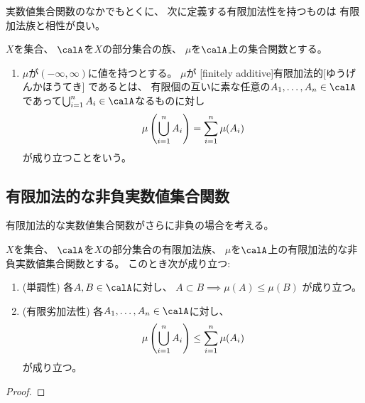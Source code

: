 \documentclass[report]{jlreq}
\begin{document}
実数値集合関数のなかでもとくに、
次に定義する有限加法性を持つものは
有限加法族と相性が良い。

\begin{definition}[有限加法性]
    $X$を集合、
    $\calA$を$X$の部分集合の族、
    $\mu$を$\calA$上の集合関数とする。
    \begin{enumerate}
        \item $\mu$が$(-\infty, \infty)$に値を持つとする。
            $\mu$が
            [finitely additive]{有限加法的}[ゆうげんかほうてき]
            であるとは、
            有限個の互いに素な任意の$A_1, \dots, A_n \in \calA$
            であって$\bigcup_{i = 1}^n A_i \in \calA$なるものに対し
            \begin{equation}
                \mu\left({\bigcup_{i = 1}^n A_i}\right) = \sum_{i = 1}^n \mu(A_i)
            \end{equation}
            が成り立つことをいう。
    \end{enumerate}
\end{definition}

\subsection{有限加法的な非負実数値集合関数}

有限加法的な実数値集合関数がさらに非負の場合を考える。

\begin{proposition}[有限加法的な非負実数値集合関数の基本性質]
    $X$を集合、
    $\calA$を$X$の部分集合の有限加法族、
    $\mu$を$\calA$上の有限加法的な非負実数値集合関数とする。
    このとき次が成り立つ:
    \begin{enumerate}
        \item (単調性) 各$A, B \in \calA$に対し、
            $A \subset B \implies \mu(A) \leq \mu(B)$
            が成り立つ。
        \item (有限劣加法性) 各$A_1, \dots, A_n \in \calA$に対し、
            \begin{equation}
                \mu\left({\bigcup_{i = 1}^n A_i}\right)
                    \le \sum_{i = 1}^n \mu(A_i)
            \end{equation}
            が成り立つ。
    \end{enumerate}
\end{proposition}

\begin{proof}
    \TODO{}
\end{proof}
\end{document}

